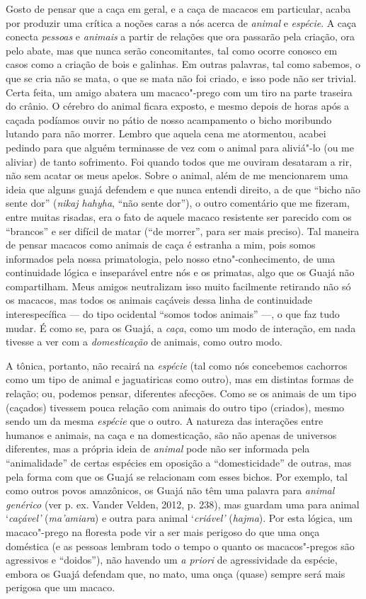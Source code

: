 Gosto de pensar que a caça em geral, e a caça de macacos em particular,
acaba por produzir uma crítica a noções caras a nós acerca de
\emph{animal} e \emph{espécie}. A caça conecta \emph{pessoas} e
\emph{animais} a partir de relações que ora passarão pela criação, ora
pelo abate, mas que nunca serão concomitantes, tal como ocorre conosco
em casos como a criação de bois e galinhas. Em outras palavras, tal como
sabemos, o que se cria não se mata, o que se mata não foi criado, e isso
pode não ser trivial. Certa feita, um amigo abatera um macaco"-prego com
um tiro na parte traseira do crânio. O cérebro do animal ficara exposto,
e mesmo depois de horas após a caçada podíamos ouvir no pátio de nosso
acampamento o bicho moribundo lutando para não morrer. Lembro que aquela
cena me atormentou, acabei pedindo para que alguém terminasse de vez com
o animal para aliviá"-lo (ou me aliviar) de tanto sofrimento. Foi quando
todos que me ouviram desataram a rir, não sem acatar os meus apelos.
Sobre o animal, além de me mencionarem uma ideia que alguns guajá
defendem e que nunca entendi direito, a de que ``bicho não sente dor''
(\emph{nikaj hahyha}, ``não sente dor''), o outro comentário que me
fizeram, entre muitas risadas, era o fato de aquele macaco resistente
ser parecido com os ``brancos'' e ser difícil de matar (``de morrer'',
para ser mais preciso). Tal maneira de pensar macacos como animais de
caça é estranha a mim, pois somos informados pela nossa primatologia,
pelo nosso etno"-conhecimento, de uma continuidade lógica e inseparável
entre nós e os primatas, algo que os Guajá não compartilham. Meus amigos
neutralizam isso muito facilmente retirando não só os macacos, mas todos
os animais caçáveis dessa linha de continuidade interespecífica --- do
tipo ocidental ``somos todos animais'' ---, o que faz tudo mudar. É como
se, para os Guajá, a \emph{caça}, como um modo de interação, em nada
tivesse a ver com a \emph{domesticação} de animais, como outro modo.

A tônica, portanto, não recairá na \emph{espécie} (tal como nós
concebemos cachorros como um tipo de animal e jaguatiricas como outro),
mas em distintas formas de relação; ou, podemos pensar, diferentes
afecções. Como se os animais de um tipo (caçados) tivessem pouca relação
com animais do outro tipo (criados), mesmo sendo um da mesma
\emph{espécie} que o outro. A natureza das interações entre humanos e
animais, na caça e na domesticação, são não apenas de universos
diferentes, mas a própria ideia de \emph{animal} pode não ser informada
pela ``animalidade'' de certas espécies em oposição a ``domesticidade''
de outras, mas pela forma com que os Guajá se relacionam com esses
bichos. Por exemplo, tal como outros povos amazônicos, os Guajá não têm
uma palavra para \emph{animal} \emph{genérico} (ver p. ex. Vander Velden,
2012, p. 238), mas guardam uma para animal `\emph{caçável'}
(\emph{ma'amiara}) e outra para animal `\emph{criável'} (\emph{hajma}).
Por esta lógica, um macaco"-prego na floresta pode vir a ser mais
perigoso do que uma onça doméstica (e as pessoas lembram todo o tempo o
quanto os macacos"-pregos são agressivos e ``doidos''), não havendo um
\emph{a priori} de agressividade da espécie, embora os Guajá defendam
que, no mato, uma onça (quase) sempre será mais perigosa que um macaco.


